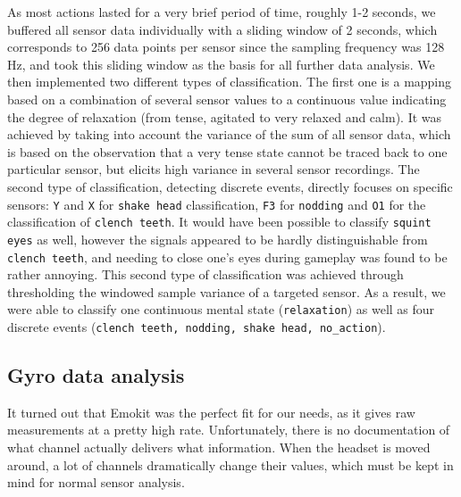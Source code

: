 \documentclass{utue} %
\begin{document}
As most actions lasted for a very brief period of time, roughly 1-2 seconds, we buffered all sensor data individually with a sliding window of 2 seconds, which corresponds to 256 data points per sensor since the sampling frequency was 128 Hz, and took this sliding window as the basis for all further data analysis. We then implemented two different types of classification. The first one is a mapping based on a combination of several sensor values to a continuous value indicating the degree of relaxation (from tense, agitated to very relaxed and calm). It was achieved by taking into account the variance of the sum of all sensor data, which is based on the observation that a very tense state cannot be traced back to one particular sensor, but elicits high variance in several sensor recordings. The second type of classification, detecting discrete events, directly focuses on specific sensors: 
\texttt{Y} and \texttt{X} for \texttt{shake head} classification, \texttt{F3} for \texttt{nodding} and \texttt{O1} for the classification of \texttt{clench teeth}. It would have been possible to classify \texttt{squint eyes} as well, however the signals appeared to be hardly distinguishable from \texttt{clench teeth}, and needing to close one's eyes during gameplay was found to be rather annoying. This second type of classification was achieved through thresholding the windowed sample variance of a targeted sensor. As a result, we were able to classify one continuous mental state (\texttt{relaxation}) as well as four discrete events (\texttt{clench teeth, nodding, shake head, no\_action}).

\subsection{Gyro data analysis}

It turned out that Emokit was the perfect fit for our needs, as it gives raw measurements at a pretty high rate. Unfortunately, there is no documentation of what channel actually delivers what information. When the headset is moved around, a lot of channels dramatically change their values, which must be kept in mind for normal sensor analysis. 
\end{document}
